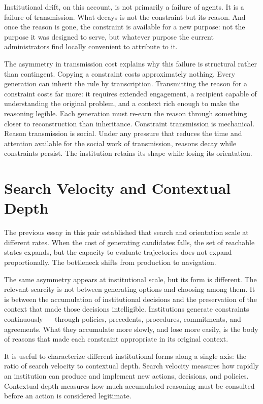 Institutional drift, on this account, is not primarily a failure of agents.
It is a failure of transmission. What decays is not the constraint but its
reason. And once the reason is gone, the constraint is available for a new
purpose: not the purpose it was designed to serve, but whatever purpose the
current administrators find locally convenient to attribute to it.

The asymmetry in transmission cost explains why this failure is structural
rather than contingent. Copying a constraint costs approximately nothing.
Every generation can inherit the rule by transcription. Transmitting the
reason for a constraint costs far more: it requires extended engagement, a
recipient capable of understanding the original problem, and a context rich
enough to make the reasoning legible. Each generation must re-earn the reason
through something closer to reconstruction than inheritance. Constraint
transmission is mechanical. Reason transmission is social. Under any pressure
that reduces the time and attention available for the social work of
transmission, reasons decay while constraints persist. The institution retains
its shape while losing its orientation.

\section{Search Velocity and Contextual Depth}

The previous essay in this pair established that search and orientation scale
at different rates. When the cost of generating candidates falls, the set of
reachable states expands, but the capacity to evaluate trajectories does not
expand proportionally. The bottleneck shifts from production to navigation.

The same asymmetry appears at institutional scale, but its form is different.
The relevant scarcity is not between generating options and choosing among them.
It is between the accumulation of institutional decisions and the preservation
of the context that made those decisions intelligible. Institutions generate
constraints continuously --- through policies, precedents, procedures, commitments,
and agreements. What they accumulate more slowly, and lose more easily, is
the body of reasons that made each constraint appropriate in its original context.

It is useful to characterize different institutional forms along a single
axis: the ratio of search velocity to contextual depth. Search velocity
measures how rapidly an institution can produce and implement new actions,
decisions, and policies. Contextual depth measures how much accumulated
reasoning must be consulted before an action is considered legitimate.

